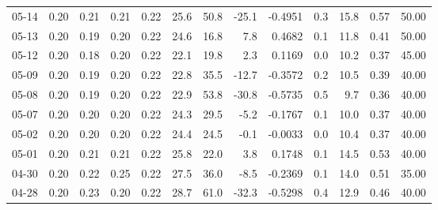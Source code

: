 \begin{threeparttable}
{\begin{tabular}{lrrrrrrrrrrrr}
  05-14 &          0.20 &          0.21 &          0.21 &        0.22 &                25.6 &                50.8 &      -25.1 &      -0.4951 &                 0.3 &             15.8 &            0.57 &                  50.00 \\
  05-13 &          0.20 &          0.19 &          0.20 &        0.22 &                24.6 &                16.8 &        7.8 &       0.4682 &                 0.1 &             11.8 &            0.41 &                  50.00 \\
  05-12 &          0.20 &          0.18 &          0.20 &        0.22 &                22.1 &                19.8 &        2.3 &       0.1169 &                 0.0 &             10.2 &            0.37 &                  45.00 \\
  05-09 &          0.20 &          0.19 &          0.20 &        0.22 &                22.8 &                35.5 &      -12.7 &      -0.3572 &                 0.2 &             10.5 &            0.39 &                  40.00 \\
  05-08 &          0.20 &          0.19 &          0.20 &        0.22 &                22.9 &                53.8 &      -30.8 &      -0.5735 &                 0.5 &              9.7 &            0.36 &                  40.00 \\
  05-07 &          0.20 &          0.20 &          0.20 &        0.22 &                24.3 &                29.5 &       -5.2 &      -0.1767 &                 0.1 &             10.0 &            0.37 &                  40.00 \\
  05-02 &          0.20 &          0.20 &          0.20 &        0.22 &                24.4 &                24.5 &       -0.1 &      -0.0033 &                 0.0 &             10.4 &            0.37 &                  40.00 \\
  05-01 &          0.20 &          0.21 &          0.21 &        0.22 &                25.8 &                22.0 &        3.8 &       0.1748 &                 0.1 &             14.5 &            0.53 &                  40.00 \\
  04-30 &          0.20 &          0.22 &          0.25 &        0.22 &                27.5 &                36.0 &       -8.5 &      -0.2369 &                 0.1 &             14.0 &            0.51 &                  35.00 \\
  04-28 &          0.20 &          0.23 &          0.20 &        0.22 &                28.7 &                61.0 &      -32.3 &      -0.5298 &                 0.4 &             12.9 &            0.46 &                  40.00 \\

\end{tabular}}
\end{threeparttable}
